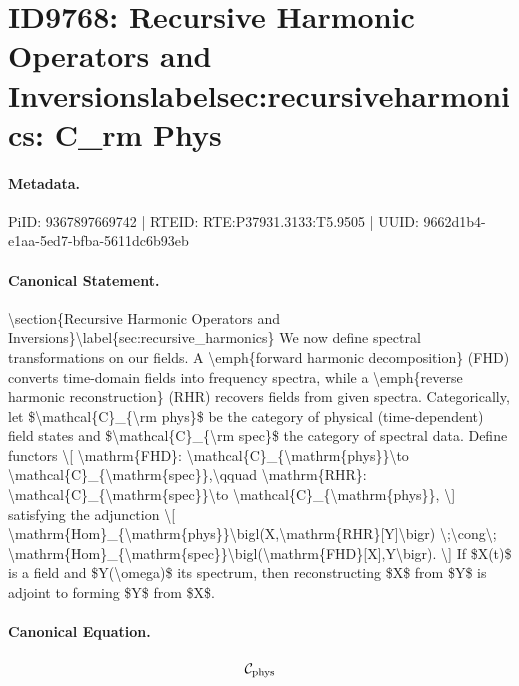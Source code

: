 \section*{ID9768: Recursive Harmonic Operators and Inversionslabelsec:recursiveharmonics: C\_rm Phys}
\paragraph{Metadata.}
PiID: 9367897669742 | RTEID: RTE:P37931.3133:T5.9505 | UUID: 9662d1b4-e1aa-5ed7-bfba-5611dc6b93eb

\paragraph{Canonical Statement.}
\textbackslash{}section\{Recursive Harmonic Operators and Inversions\}\textbackslash{}label\{sec:recursive\_harmonics\} We now define spectral transformations on our fields. A \textbackslash{}emph\{forward harmonic decomposition\} (FHD) converts time-domain fields into frequency spectra, while a \textbackslash{}emph\{reverse harmonic reconstruction\} (RHR) recovers fields from given spectra. Categorically, let \$\textbackslash{}mathcal\{C\}\_\{\textbackslash{}rm phys\}\$ be the category of physical (time-dependent) field states and \$\textbackslash{}mathcal\{C\}\_\{\textbackslash{}rm spec\}\$ the category of spectral data. Define functors \textbackslash{}[ \textbackslash{}mathrm\{FHD\}: \textbackslash{}mathcal\{C\}\_\{\textbackslash{}mathrm\{phys\}\}\textbackslash{}to \textbackslash{}mathcal\{C\}\_\{\textbackslash{}mathrm\{spec\}\},\textbackslash{}qquad \textbackslash{}mathrm\{RHR\}: \textbackslash{}mathcal\{C\}\_\{\textbackslash{}mathrm\{spec\}\}\textbackslash{}to \textbackslash{}mathcal\{C\}\_\{\textbackslash{}mathrm\{phys\}\}, \textbackslash{}] satisfying the adjunction \textbackslash{}[ \textbackslash{}mathrm\{Hom\}\_\{\textbackslash{}mathrm\{phys\}\}\textbackslash{}bigl(X,\textbackslash{}mathrm\{RHR\}[Y]\textbackslash{}bigr) \textbackslash{};\textbackslash{}cong\textbackslash{}; \textbackslash{}mathrm\{Hom\}\_\{\textbackslash{}mathrm\{spec\}\}\textbackslash{}bigl(\textbackslash{}mathrm\{FHD\}[X],Y\textbackslash{}bigr). \textbackslash{}] If \$X(t)\$ is a field and \$Y(\textbackslash{}omega)\$ its spectrum, then reconstructing \$X\$ from \$Y\$ is adjoint to forming \$Y\$ from \$X\$.

\paragraph{Canonical Equation.}
\[
\mathcal{C}_{\rm phys}
\]

